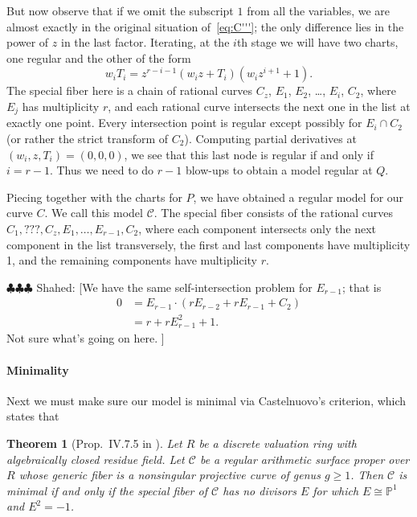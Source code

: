 \documentclass{article}
\newcommand{\shahed}[1]{{\color{Purple} \sf $\clubsuit\clubsuit\clubsuit$ Shahed: [#1]}}
\newcommand{\scd}{\mathscr{C}}
\theoremstyle{plain}
\newtheorem{theorem}{Theorem}[section]
\theoremstyle{definition}
\theoremstyle{remark}
\newcommand{\isom}{\cong}
\newcommand{\Pro}{\ensuremath{\mathbb{P}}}
\begin{document}
But now observe that if we omit the subscript $1$ from all the variables, we are almost exactly in the original situation of~\eqref{eq:C'''}; the only difference lies in the power of $z$ in the last factor. Iterating, at the $i$th stage we will have two charts, one regular and the other of the form
\[
w_i T_i = z^{r-i-1}(w_iz + T_i)(w_i z^{i+1} + 1).
\]
The special fiber here is a chain of rational curves ${C_z}$, $E_{1}$, $E_{2}$, \dots, $E_{i}$, ${C_2}$, where $E_j$ has multiplicity $r$, and each rational curve intersects the next one in the list at exactly one point. Every intersection point is regular except possibly for $E_{i} \cap C_2$ (or rather the strict transform of $C_2$). Computing partial derivatives at $(w_i, z, T_i) = (0,0,0)$, we see that this last node is regular if and only if $i = r - 1$. Thus we need to do $r - 1$ blow-ups to obtain a model regular at $Q$.

Piecing together with the charts for $P$, we have obtained a regular model for our curve $C$. We call this model $\scd$. The special fiber consists of the rational curves $C_1, ???, C_z, E_1, \dots, E_{r-1}, C_2$, where each component intersects only the next component in the list transversely, the first and last components have multiplicity 1, and the remaining components have multiplicity $r$.

\shahed{We have the same self-intersection problem for $E_{r-1}$; that is
  \begin{align*}
    0 &= E_{r-1} \cdot (rE_{r-2} + rE_{r-1} + C_2) \\
    &= r + r E_{r-1}^2 + 1.
  \end{align*}
  Not sure what's going on here.
  }


\paragraph{Minimality}
\label{sec:minimality}

Next we must make sure our model is minimal via Castelnuovo's criterion, which states that
\begin{theorem}[Prop.~IV.7.5 in \cite{silvermanATAEC}]\label{thm:castelnuovo}
  Let $R$ be a discrete valuation ring with algebraically closed residue field. Let $\scd$ be a regular arithmetic surface proper over $R$ whose generic fiber is a nonsingular projective curve of genus $g \geq 1$. Then $\scd$ is minimal if and only if the special fiber of $\scd$ has no divisors $E$ for which $E \isom \Pro^1$ and $E^2 = -1$.
\end{theorem}
\end{document}
